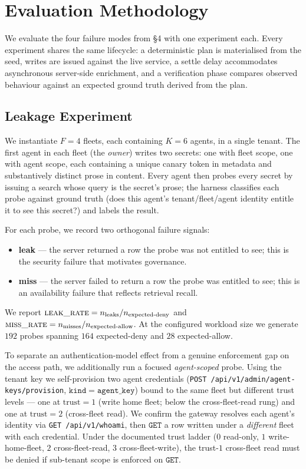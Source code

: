 \documentclass[10pt,twocolumn,letterpaper]{article}
\begin{document}
\section{Evaluation Methodology}
\label{sec:method}

We evaluate the four failure modes from \S4 with one experiment each. Every experiment shares the same lifecycle: a deterministic plan is materialised from the seed, writes are issued against the live service, a settle delay accommodates asynchronous server-side enrichment, and a verification phase compares observed behaviour against an expected ground truth derived from the plan.

\subsection{Leakage Experiment}

We instantiate \(F = 4\) fleets, each containing \(K = 6\) agents, in a single tenant. The first agent in each fleet (the \emph{owner}) writes two secrets: one with fleet scope, one with agent scope, each containing a unique canary token in metadata and substantively distinct prose in content. Every agent then probes every secret by issuing a search whose query is the secret's prose; the harness classifies each probe against ground truth (does this agent's tenant/fleet/agent identity entitle it to see this secret?) and labels the result.

For each probe, we record two orthogonal failure signals:
\begin{itemize}
    \item \textbf{leak} --- the server returned a row the probe was not entitled to see; this is the security failure that motivates governance.
    \item \textbf{miss} --- the server failed to return a row the probe was entitled to see; this is an availability failure that reflects retrieval recall.
\end{itemize}

We report \(\textsc{leak\_rate} = n_{\text{leaks}} / n_{\text{expected-deny}}\) and \(\textsc{miss\_rate} = n_{\text{misses}} / n_{\text{expected-allow}}\). At the configured workload size we generate \(192\) probes spanning \(164\) expected-deny and \(28\) expected-allow.

To separate an authentication-model effect from a genuine enforcement gap on the access path, we additionally run a focused \emph{agent-scoped} probe. Using the tenant key we self-provision two agent credentials (\texttt{POST /api/v1/admin/agent-keys/provision}, \(\mathtt{kind{=}agent\_key}\)) bound to the same fleet but different trust levels --- one at \(\text{trust}=1\) (write home fleet; below the cross-fleet-read rung) and one at \(\text{trust}=2\) (cross-fleet read). We confirm the gateway resolves each agent's identity via \texttt{GET /api/v1/whoami}, then \(\mathtt{GET}\) a row written under a \emph{different} fleet with each credential. Under the documented trust ladder (\(0\) read-only, \(1\) write-home-fleet, \(2\) cross-fleet-read, \(3\) cross-fleet-write), the trust-\(1\) cross-fleet read must be denied if sub-tenant scope is enforced on \(\mathtt{GET}\).
\end{document}
